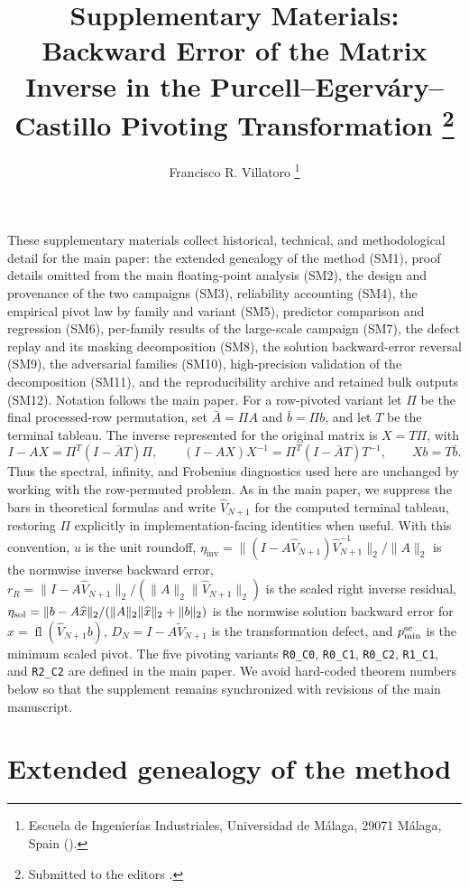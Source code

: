 \documentclass[supplement,review,onefignum,onetabnum]{siamart251216}
\title{Supplementary Materials: Backward Error of the Matrix Inverse in the Purcell--Egerv\'ary--Castillo Pivoting Transformation%
\thanks{Submitted to the editors \submissiondate.}}
\author{Francisco R. Villatoro%
\thanks{Escuela de Ingenier\'ias Industriales, Universidad de M\'alaga,
29071 M\'alaga, Spain
(\email{frvillatoro@uma.es}).}}
\newcommand{\fl}{\operatorname{fl}}
\begin{document}
\maketitle

These supplementary materials collect historical, technical, and methodological detail for the
main paper: the extended genealogy of the method (SM1), proof details omitted from the main
floating-point analysis (SM2), the design and provenance of the two campaigns (SM3), reliability
accounting (SM4), the empirical pivot law by family and variant (SM5), predictor comparison and
regression (SM6), per-family results of the large-scale campaign (SM7), the defect replay and its
masking decomposition (SM8), the solution backward-error reversal (SM9), the adversarial families
(SM10), high-precision validation of the decomposition (SM11), and the reproducibility archive and retained bulk outputs (SM12). Notation follows the
main paper. For a row-pivoted variant let $\Pi$ be the final processed-row permutation, set
$\bar A=\Pi A$ and $\bar b=\Pi b$, and let $T$ be the terminal tableau. The inverse represented for
the original matrix is $X=T\Pi$, with
\[
I-AX=\Pi^T(I-\bar A T)\Pi,
\qquad
(I-AX)X^{-1}=\Pi^T(I-\bar A T)T^{-1},
\qquad Xb=T\bar b.
\]
Thus the spectral, infinity, and Frobenius diagnostics used here are unchanged by working with the
row-permuted problem. As in the main paper, we suppress the bars in theoretical formulas and write
$\widehat V_{N+1}$ for the computed terminal tableau, restoring $\Pi$ explicitly in
implementation-facing identities when useful. With this convention, $u$ is the unit roundoff,
$\eta_{\mathrm{inv}}=\|(I-A\widehat V_{N+1})\widehat V_{N+1}^{-1}\|_2/\|A\|_2$ is the normwise
inverse backward error,
$r_R=\|I-A\widehat V_{N+1}\|_2/(\|A\|_2\|\widehat V_{N+1}\|_2)$ is the scaled right inverse
residual, $\eta_{\rm sol}=\|b-A\widehat x\|_2/(\|A\|_2\|\widehat x\|_2+\|b\|_2)$ is the normwise
solution backward error for $\widehat x=\fl(\widehat V_{N+1}b)$,
$D_N=I-A\widetilde V_{N+1}$ is the transformation defect, and $p^{\rm sc}_{\min}$ is the minimum
scaled pivot. The five pivoting variants \texttt{R0\_C0}, \texttt{R0\_C1}, \texttt{R0\_C2},
\texttt{R1\_C1}, and \texttt{R2\_C2} are defined in the main paper. We avoid hard-coded theorem
numbers below so that the supplement remains synchronized with revisions of the main manuscript.

\section{Extended genealogy of the method}
\label{sm:genealogy}
\end{document}
